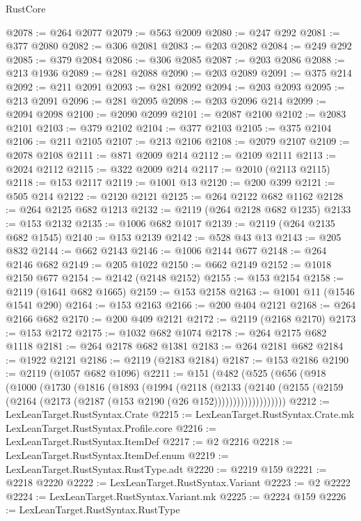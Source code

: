 \begin{lexlean}{RustCore}
\begin{coremodule}
@2078 := @264 @2077
@2079 := @563 @2009
@2080 := @247 @292
@2081 := @377 @2080
@2082 := @306 @2081
@2083 := @203 @2082
@2084 := @249 @292
@2085 := @379 @2084
@2086 := @306 @2085
@2087 := @203 @2086
@2088 := @213 @1936
@2089 := @281 @2088
@2090 := @203 @2089
@2091 := @375 @214
@2092 := @211 @2091
@2093 := @281 @2092
@2094 := @203 @2093
@2095 := @213 @2091
@2096 := @281 @2095
@2098 := @203 @2096 @214
@2099 := @2094 @2098
@2100 := @2090 @2099
@2101 := @2087 @2100
@2102 := @2083 @2101
@2103 := @379 @2102
@2104 := @377 @2103
@2105 := @375 @2104
@2106 := @211 @2105
@2107 := @213 @2106
@2108 := @2079 @2107
@2109 := @2078 @2108
@2111 := @871 @2009 @214
@2112 := @2109 @2111
@2113 := @2024 @2112
@2115 := @322 @2009 @214
@2117 := @2010 (@2113 @2115)
@2118 := @153 @2117
@2119 := @1001 @13
@2120 := @200 @399
@2121 := @505 @214
@2122 := @2120 @2121
@2125 := @264 @2122 @682 @1162
@2128 := @264 @2125 @682 @1213
@2132 := @2119 (@264 @2128 @682 @1235)
@2133 := @153 @2132
@2135 := @1006 @682 @1017
@2139 := @2119 (@264 @2135 @682 @1545)
@2140 := @153 @2139
@2142 := @528 @43 @13
@2143 := @205 @832
@2144 := @662 @2143
@2146 := @1006 @2144 @677
@2148 := @264 @2146 @682
@2149 := @205 @1022
@2150 := @662 @2149
@2152 := @1018 @2150 @677
@2154 := @2142 (@2148 @2152)
@2155 := @153 @2154
@2158 := @2119 (@1641 @682 @1665)
@2159 := @153 @2158
@2163 := @1001 @11 (@1546 @1541 @290)
@2164 := @153 @2163
@2166 := @200 @404 @2121
@2168 := @264 @2166 @682
@2170 := @200 @409 @2121
@2172 := @2119 (@2168 @2170)
@2173 := @153 @2172
@2175 := @1032 @682 @1074
@2178 := @264 @2175 @682 @1118
@2181 := @264 @2178 @682 @1381
@2183 := @264 @2181 @682
@2184 := @1922 @2121
@2186 := @2119 (@2183 @2184)
@2187 := @153 @2186
@2190 := @2119 (@1057 @682 @1096)
@2211 := @151
    (@482
      (@525
        (@656
          (@918
            (@1000
              (@1730
                (@1816
                  (@1893
                    (@1994
                      (@2118
                        (@2133
                          (@2140
                            (@2155
                              (@2159 (@2164 (@2173 (@2187 (@153 @2190 (@26 @152)))))))))))))))))))
@2212 := LexLeanTarget.RustSyntax.Crate
@2215 := LexLeanTarget.RustSyntax.Crate.mk LexLeanTarget.RustSyntax.Profile.core
@2216 := LexLeanTarget.RustSyntax.ItemDef
@2217 := @2 @2216
@2218 := LexLeanTarget.RustSyntax.ItemDef.enum
@2219 := LexLeanTarget.RustSyntax.RustType.adt
@2220 := @2219 @159
@2221 := @2218 @2220
@2222 := LexLeanTarget.RustSyntax.Variant
@2223 := @2 @2222
@2224 := LexLeanTarget.RustSyntax.Variant.mk
@2225 := @2224 @159
@2226 := LexLeanTarget.RustSyntax.RustType

\end{coremodule}
\end{lexlean}
